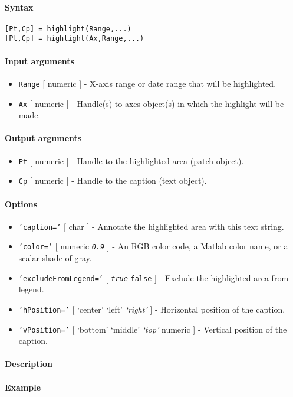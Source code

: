 


	\paragraph{Syntax}

\begin{verbatim}
[Pt,Cp] = highlight(Range,...)
[Pt,Cp] = highlight(Ax,Range,...)
\end{verbatim}

\paragraph{Input arguments}

\begin{itemize}
\item
  \texttt{Range} {[} numeric {]} - X-axis range or date range that will
  be highlighted.
\item
  \texttt{Ax} {[} numeric {]} - Handle(s) to axes object(s) in which the
  highlight will be made.
\end{itemize}

\paragraph{Output arguments}

\begin{itemize}
\item
  \texttt{Pt} {[} numeric {]} - Handle to the highlighted area (patch
  object).
\item
  \texttt{Cp} {[} numeric {]} - Handle to the caption (text object).
\end{itemize}

\paragraph{Options}

\begin{itemize}
\item
  \texttt{'caption='} {[} char {]} - Annotate the highlighted area with
  this text string.
\item
  \texttt{'color='} {[} numeric \textbar{} \emph{\texttt{0.9}} {]} - An
  RGB color code, a Matlab color name, or a scalar shade of gray.
\item
  \texttt{'excludeFromLegend='} {[} \emph{\texttt{true}} \textbar{}
  \texttt{false} {]} - Exclude the highlighted area from legend.
\item
  \texttt{'hPosition='} {[} `center' \textbar{} `left' \textbar{}
  \emph{`right'} {]} - Horizontal position of the caption.
\item
  \texttt{'vPosition='} {[} `bottom' \textbar{} `middle' \textbar{}
  \emph{`top'} \textbar{} numeric {]} - Vertical position of the
  caption.
\end{itemize}

\paragraph{Description}

\paragraph{Example}


